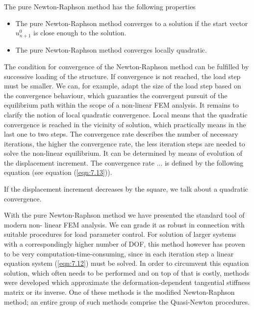 The pure Newton-Raphson method has the following properties
\begin{itemize}
    \item The pure Newton-Raphson method converges to a solution if the start vector $u^0_{ n+1} $ is close enough to the solution.
    \item The pure Newton-Raphson method converges locally quadratic.
\end{itemize}

The condition for convergence of the Newton-Raphson method can be fulfilled by successive loading of the structure. If convergence is not reached, the load step must be smaller. We
can, for example, adapt the size of the load step based on the convergence behaviour, which guaranties the convergent pursuit of the equilibrium path within the
scope of a non-linear FEM analysis. It remains to clarify the notion of local quadratic convergence. Local means that the quadratic convergence is reached in the vicinity of solution, which
practically means in the last one to two steps. The convergence rate describes the number of
necessary iterations, the higher the convergence rate, the less iteration steps are needed to solve
the non-linear equilibrium. It can be determined by means of evolution of the displacement
increment. The convergence rate ... is defined by the following equation (see equation (\ref{eqn:7.13})).

If the displacement increment decreases by the square, we talk about a quadratic convergence.

With the pure Newton-Raphson method we have presented the standard tool of modern non-
linear FEM analysis. We can grade it as robust in connection with suitable procedures for load
parameter control. For solution of larger systems with a correspondingly higher number of DOF,
this method however has proven to be very computation-time-consuming, since in each iteration
step a linear equation system (\ref{eqn:7.12}) must be solved. In order to circumvent this equation solution, which often needs to be performed and on top of that is costly, methods were developed which
approximate the deformation-dependent tangential stiffness matrix or its inverse. One of these
methods is the modified Newton-Raphson method; an entire group of such methods comprise
the Quasi-Newton procedures.
